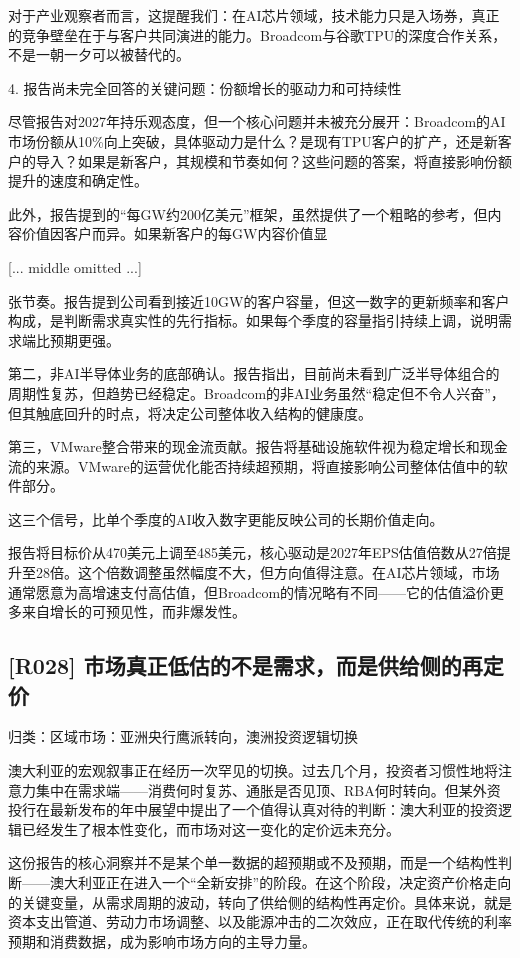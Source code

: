 \documentclass[11pt]{ctexart}
\begin{document}
对于产业观察者而言，这提醒我们：在AI芯片领域，技术能力只是入场券，真正的竞争壁垒在于与客户共同演进的能力。Broadcom与谷歌TPU的深度合作关系，不是一朝一夕可以被替代的。

4. 报告尚未完全回答的关键问题：份额增长的驱动力和可持续性

尽管报告对2027年持乐观态度，但一个核心问题并未被充分展开：Broadcom的AI市场份额从10\%向上突破，具体驱动力是什么？是现有TPU客户的扩产，还是新客户的导入？如果是新客户，其规模和节奏如何？这些问题的答案，将直接影响份额提升的速度和确定性。

此外，报告提到的“每GW约200亿美元”框架，虽然提供了一个粗略的参考，但内容价值因客户而异。如果新客户的每GW内容价值显

[... middle omitted ...]

张节奏。报告提到公司看到接近10GW的客户容量，但这一数字的更新频率和客户构成，是判断需求真实性的先行指标。如果每个季度的容量指引持续上调，说明需求端比预期更强。

第二，非AI半导体业务的底部确认。报告指出，目前尚未看到广泛半导体组合的周期性复苏，但趋势已经稳定。Broadcom的非AI业务虽然“稳定但不令人兴奋”，但其触底回升的时点，将决定公司整体收入结构的健康度。

第三，VMware整合带来的现金流贡献。报告将基础设施软件视为稳定增长和现金流的来源。VMware的运营优化能否持续超预期，将直接影响公司整体估值中的软件部分。

这三个信号，比单个季度的AI收入数字更能反映公司的长期价值走向。

报告将目标价从470美元上调至485美元，核心驱动是2027年EPS估值倍数从27倍提升至28倍。这个倍数调整虽然幅度不大，但方向值得注意。在AI芯片领域，市场通常愿意为高增速支付高估值，但Broadcom的情况略有不同——它的估值溢价更多来自增长的可预见性，而非爆发性。

\subsection{[R028] 市场真正低估的不是需求，而是供给侧的再定价}
{\small\color{refgray}归类：区域市场：亚洲央行鹰派转向，澳洲投资逻辑切换}

澳大利亚的宏观叙事正在经历一次罕见的切换。过去几个月，投资者习惯性地将注意力集中在需求端——消费何时复苏、通胀是否见顶、RBA何时转向。但某外资投行在最新发布的年中展望中提出了一个值得认真对待的判断：澳大利亚的投资逻辑已经发生了根本性变化，而市场对这一变化的定价远未充分。

这份报告的核心洞察并不是某个单一数据的超预期或不及预期，而是一个结构性判断——澳大利亚正在进入一个“全新安排”的阶段。在这个阶段，决定资产价格走向的关键变量，从需求周期的波动，转向了供给侧的结构性再定价。具体来说，就是资本支出管道、劳动力市场调整、以及能源冲击的二次效应，正在取代传统的利率预期和消费数据，成为影响市场方向的主导力量。
\end{document}
